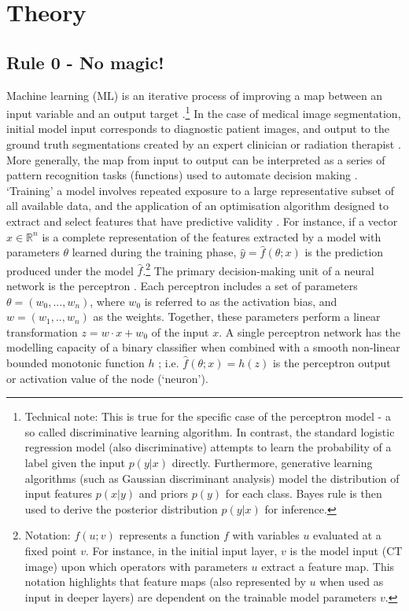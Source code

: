 \chapter{Theory}
\label{ch:theory}

\section{Rule 0 - No magic!}
\label{NoMagic} Machine learning (ML) is an iterative process of improving a map
between an input variable and an output target
\cite{Maier2019}.\footnote{Technical note: This is true for the specific case of
the perceptron model - a so called discriminative learning algorithm. In
contrast, the standard logistic regression model (also discriminative) attempts
to learn the probability of a label given the input $p(y|x)$ directly.
Furthermore, generative learning algorithms (such as Gaussian discriminant
analysis) model the distribution of input features $p(x|y)$ and priors $p(y)$
for each class. Bayes rule is then used to derive the posterior distribution
$p(y|x)$ for inference.} In the case of medical image segmentation, initial
model input corresponds to diagnostic patient images, and output to the ground
truth segmentations created by an expert clinician or radiation therapist
\cite{Kazemifar_2018}. More generally, the map from input to output can be
interpreted as a series of pattern recognition tasks (functions) used to
automate decision making \cite{Maier2019}. `Training' a model involves repeated
exposure to a large representative subset of all available data, and the
application of an optimisation algorithm designed to extract and select features
that have predictive validity \cite{Maier2019}. For instance, if a vector
$x\in\mathbb{R}^{n}$ is a complete representation of the features extracted by a
model with parameters $\theta$ learned during the training phase, $\hat{y} =
\hat{f}(\theta; x)$ is the prediction produced under the model
$\hat{f}$.\footnote{Notation: $f(u; v)$ represents a function $f$ with variables
$u$ evaluated at a fixed point $v$. For instance, in the initial input layer,
$v$ is the model input (CT image) upon which operators with parameters $u$
extract a feature map. This notation highlights that feature maps (also
represented by $u$ when used as input in deeper layers) are dependent on the
trainable model parameters $v$.} The primary decision-making unit of a neural
network is the perceptron \cite{Maier2019}. Each perceptron includes a set of
parameters $\theta = (w_{0}, ...,w_{n} )$, where $w_{0}$ is referred to as the
activation bias, and $w = (w_{1},..,w_{n})$ as the weights. Together, these
parameters perform a linear transformation $z = w \cdot x + w_{0}$ of the input
$x$. A single perceptron network has the modelling capacity of a binary
classifier when combined with a smooth non-linear bounded monotonic function $h$
\cite{Maier2019}; i.e. $\hat{f}(\theta; x) = h(z)$ is the perceptron output or
activation value of the node (`neuron').


